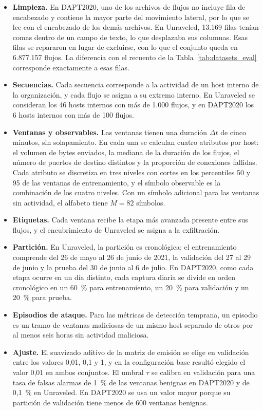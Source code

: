 \begin{itemize}
    \item \textbf{Limpieza.} En DAPT2020, uno de los archivos de flujos no incluye fila de encabezado y contiene la mayor parte del movimiento lateral, por lo que se lee con el encabezado de los demás archivos. En Unraveled, 13.169 filas tenían comas dentro de un campo de texto, lo que desplazaba sus columnas. Esas filas se repararon en lugar de excluirse, con lo que el conjunto queda en 6.877.157 flujos. La diferencia con el recuento de la Tabla~\ref{tab:datasets_eval} corresponde exactamente a esas filas.
    \item \textbf{Secuencias.} Cada secuencia corresponde a la actividad de un host interno de la organización, y cada flujo se asigna a su extremo interno. En Unraveled se consideran los 46 hosts internos con más de 1.000 flujos, y en DAPT2020 los 6 hosts internos con más de 100 flujos.
    \item \textbf{Ventanas y observables.} Las ventanas tienen una duración $\Delta t$ de cinco minutos, sin solapamiento. En cada una se calculan cuatro atributos por host: el volumen de bytes enviados, la mediana de la duración de los flujos, el número de puertos de destino distintos y la proporción de conexiones fallidas. Cada atributo se discretiza en tres niveles con cortes en los percentiles 50 y 95 de las ventanas de entrenamiento, y el símbolo observable es la combinación de los cuatro niveles. Con un símbolo adicional para las ventanas sin actividad, el alfabeto tiene $M = 82$ símbolos.
    \item \textbf{Etiquetas.} Cada ventana recibe la etapa más avanzada presente entre sus flujos, y el encubrimiento de Unraveled se asigna a la exfiltración.
    \item \textbf{Partición.} En Unraveled, la partición es cronológica: el entrenamiento comprende del 26 de mayo al 26 de junio de 2021, la validación del 27 al 29 de junio y la prueba del 30 de junio al 6 de julio. En DAPT2020, como cada etapa ocurre en un día distinto, cada captura diaria se divide en orden cronológico en un 60~\% para entrenamiento, un 20~\% para validación y un 20~\% para prueba.
    \item \textbf{Episodios de ataque.} Para las métricas de detección temprana, un episodio es un tramo de ventanas maliciosas de un mismo host separado de otros por al menos seis horas sin actividad maliciosa.
    \item \textbf{Ajuste.} El suavizado aditivo de la matriz de emisión se elige en validación entre los valores 0,01, 0,1 y 1, y en la configuración base resultó elegido el valor 0,01 en ambos conjuntos. El umbral $\tau$ se calibra en validación para una tasa de falsas alarmas de 1~\% de las ventanas benignas en DAPT2020 y de 0,1~\% en Unraveled. En DAPT2020 se usa un valor mayor porque su partición de validación tiene menos de 600 ventanas benignas.
\end{itemize}

